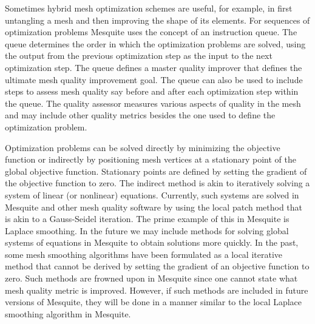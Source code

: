 Sometimes hybrid mesh optimization schemes are useful, for example, in 
first untangling a mesh and then improving the shape of its elements. For 
sequences of optimization problems Mesquite uses the concept of an 
instruction queue.  The queue determines the order in which the optimization
problems are solved, using the output from the previous optimization step 
as the input to the next optimization step. The queue defines a master 
quality improver that defines the ultimate mesh quality improvement goal.
The queue can also be used to include steps to assess mesh quality say 
before and after each optimization step within the queue.  The quality 
assessor measures various aspects of quality in the mesh and may include 
other quality metrics besides the one used to define the optimization problem.
\newline

Optimization problems can be solved directly by minimizing the objective 
function or indirectly by positioning mesh vertices at a stationary point
of the global objective function. Stationary points are defined by setting 
the gradient of the objective function to zero. The indirect method is akin 
to iteratively solving a system of linear (or nonlinear) equations. 
Currently, such systems are solved in Mesquite and other mesh quality 
software by using the local patch method that is akin 
to a Gauss-Seidel iteration. The prime example of this in Mesquite is 
Laplace smoothing. In the 
future we may include methods for solving global systems of equations 
in Mesquite to obtain solutions more quickly. 
In the past, some mesh smoothing algorithms have been formulated as a 
local iterative method that cannot be derived  
by setting the gradient of an objective function to zero. Such methods are
frowned upon in Mesquite since one cannot state what mesh quality metric is
improved.  However, if such methods are included in future versions of Mesquite, they will be done in a manner similar to the local Laplace smoothing 
algorithm in Mesquite. \newline

